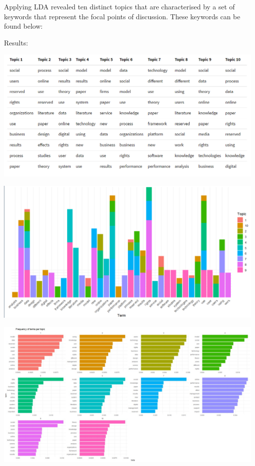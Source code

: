 \documentclass[
  letterpaper,
  DIV=11,
  numbers=noendperiod]{scrartcl}
\begin{document}
Applying LDA revealed ten distinct topics that are characterised by a
set of keywords that represent the focal points of discussion. These
keywords can be found below:

Results:

\includegraphics[width=5.20833in,height=\textheight]{images/TopicLDAResults-01.png}

\includegraphics[width=5.20833in,height=\textheight]{images/freqTermsPerTopicSingleGraph.png}

\includegraphics[width=5.20833in,height=\textheight]{images/freqTermsPerTopic-01.jpg}
\end{document}
